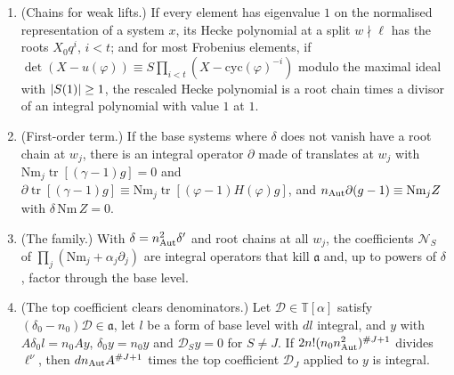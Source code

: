 \begin{theorem}\label{thm:deformed-norm}
\begin{enumerate}[label=\textup{(\alph*)}]
\item (Chains for weak lifts.) If every element has eigenvalue $1$ on the normalised representation of a system $x$, its Hecke polynomial at a split $w\nmid\ell$ has the roots $X_0q^i$, $i<t$; and for most Frobenius
elements, if $\det(X-u(\varphi))\equiv S\prod_{i<t}(X-\mathrm{cyc}(\varphi)^{-i})$ modulo the maximal ideal with $\lvert S(1)\rvert\ge1$, the rescaled Hecke polynomial is a root chain times a divisor of an integral polynomial with value $1$ at $1$.
\item (First-order term.) If the base systems where $\delta$ does not vanish have a root chain at $w_j$, there is an integral operator $\partial$ made of translates at $w_j$ with $\mathrm{Nm}_j\operatorname{tr}[(\gamma-1)g]=0$ and
$\partial\operatorname{tr}[(\gamma-1)g]\equiv\mathrm{Nm}_j\operatorname{tr}[(\varphi-1)H(\varphi)g]$, and $n_{\rm Aut}\partial(g-1)\equiv\mathrm{Nm}_jZ$ with $\delta\,\mathrm{Nm}\,Z=0$.
\item (The family.) With $\delta=n_{\rm Aut}^2\delta'$ and root chains at all $w_j$, the coefficients $\mathcal N_S$ of $\prod_j(\mathrm{Nm}_j+\alpha_j\partial_j)$ are integral operators that kill $\mathfrak a$ and, up to powers of $\delta$, factor through the
base level.
\item (The top coefficient clears denominators.) Let $\mathcal D\in\mathbb T[\alpha]$ satisfy $(\delta_0-n_0)\mathcal D\in\mathfrak a$, let $l$ be a form of base level with $dl$ integral, and $y$ with $A\delta_0l=n_0Ay$, $\delta_0y=n_0y$ and $\mathcal D_Sy=0$ for
$S\ne J$. If $2n!(n_0n_{\rm Aut}^2)^{\#J+1}$ divides $\ell^\nu$, then $dn_{\rm Aut}A^{\#J+1}$ times the top coefficient $\mathcal D_J$ applied to $y$ is integral.
\end{enumerate}
\end{theorem}

